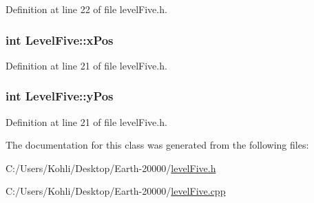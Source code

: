 Definition at line 22 of file levelFive.h.\hypertarget{class_level_five_a49d0735f7e21868c1c128bd682cb60e0}{
\subsubsection[{xPos}]{\setlength{\rightskip}{0pt plus 5cm}int {\bf LevelFive::xPos}}}
\label{class_level_five_a49d0735f7e21868c1c128bd682cb60e0}


Definition at line 21 of file levelFive.h.\hypertarget{class_level_five_aef7da49944f2c0192e80f54c427a5db9}{
\subsubsection[{yPos}]{\setlength{\rightskip}{0pt plus 5cm}int {\bf LevelFive::yPos}}}
\label{class_level_five_aef7da49944f2c0192e80f54c427a5db9}


Definition at line 21 of file levelFive.h.

The documentation for this class was generated from the following files:\begin{DoxyCompactItemize}
\item 
C:/Users/Kohli/Desktop/Earth-\/20000/\hyperlink{level_five_8h}{levelFive.h}\item 
C:/Users/Kohli/Desktop/Earth-\/20000/\hyperlink{level_five_8cpp}{levelFive.cpp}\end{DoxyCompactItemize}
